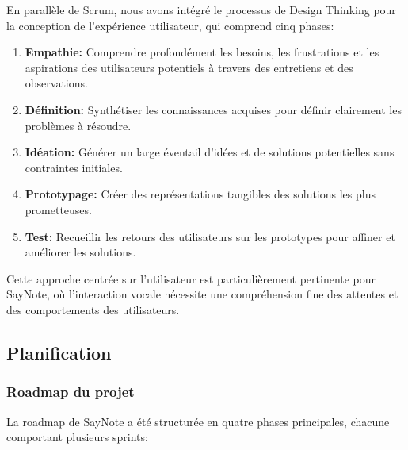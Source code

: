    En parallèle de Scrum, nous avons intégré le processus de Design Thinking pour la conception de l'expérience utilisateur, qui comprend cinq phases:
    
    \begin{enumerate}
        \item \textbf{Empathie:} Comprendre profondément les besoins, les frustrations et les aspirations des utilisateurs potentiels à travers des entretiens et des observations.
        
        \item \textbf{Définition:} Synthétiser les connaissances acquises pour définir clairement les problèmes à résoudre.
        
        \item \textbf{Idéation:} Générer un large éventail d'idées et de solutions potentielles sans contraintes initiales.
        
        \item \textbf{Prototypage:} Créer des représentations tangibles des solutions les plus prometteuses.
        
        \item \textbf{Test:} Recueillir les retours des utilisateurs sur les prototypes pour affiner et améliorer les solutions.
    \end{enumerate}
    
    Cette approche centrée sur l'utilisateur est particulièrement pertinente pour SayNote, où l'interaction vocale nécessite une compréhension fine des attentes et des comportements des utilisateurs.
    
        
    \subsection{Planification}
    
    \subsubsection{Roadmap du projet}
    
    La roadmap de SayNote a été structurée en quatre phases principales, chacune comportant plusieurs sprints:
    
